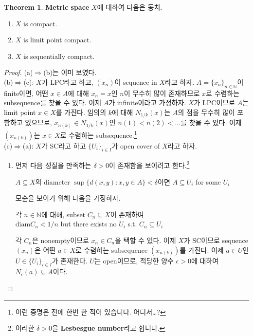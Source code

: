 \documentclass[12pt]{article}
\theoremstyle{definition}
\newtheorem{thm}{Theorem}[section]
\def\NN{\mathbb{N}}
\def\eps{\epsilon}
\begin{document}
	\begin{thm} \label{1.11}
		\textbf{Metric space} \(X\)에 대하여 다음은 동치.
		\begin{enumerate}[label=(\alph*), leftmargin=2\parindent]
			\item
			\(X\) is compact.
			\item
			\(X\) is limit point compact.
			\item
			\(X\) is sequentially compact.
		\end{enumerate}	
	\end{thm}
	\begin{proof}
		(a)$\Rightarrow$(b)는 이미 보였다.\\
		(b)$\Rightarrow$(c): \(X\)가 LPC라고 하고, \((x_n)\)이 sequence in \(X\)라고 하자. \(A = \{x_n\}_{n \in \NN}\)이 finite이면, 어떤 \(x \in A\)에 대해 \(x_n = x\)인 \(n\)이 무수히 많이 존재하므로 \(x\)로 수렴하는 subsequence를 찾을 수 있다. 이제 \(A\)가 infinite이라고 가정하자. \(X\)가 LPC이므로 \(A\)는 limit point \(x \in X\)를 가진다. 임의의 \(k\)에 대해 \(N_{1/k} (x)\)는 \(A\)의 점을 무수히 많이 포함하고 있으므로, \(x_{n(k)} \in N_{1/k} (x)\)인 \(n(1) < n(2) < \ldots\)를 찾을 수 있다. 이제 \((x_{n(k)})\)는 \(x \in X\)로 수렴하는 subsequence.\footnote{이런 증명은 전에 한번 한 적이 있습니다. 어디서\ldots?}\\
		(c)$\Rightarrow$(a): \(X\)가 SC라고 하고 \(\{U_i\}_{i \in I}\)가 open cover of \(X\)라고 하자.
		\begin{enumerate}[label={Step \arabic*}, leftmargin=3\parindent]
			\item
			먼저 다음 성질을 만족하는 \(\delta > 0\)이 존재함을 보이려고 한다.\footnote{이러한 \(\delta > 0\)을 \textbf{Lesbesgue number}라고 합니다.}
			\begin{center}
				\(A \subseteq X\)의 diameter \(\sup \{d(x, y) : x, y \in A\} < \delta\)이면 \(A \subseteq U_i\) for some \(U_i\)
			\end{center}
			모순을 보이기 위해 다음을 가정하자.
			\begin{center}
				각 \(n \in \NN\)에 대해, subset \(C_n \subseteq X\)이 존재하여\\
				\(\mathrm{diam} C_n < 1/n\) but there exists no \(U_i\) s.t. \(C_n \subseteq U_i\)
			\end{center}
			각 \(C_n\)은 nonempty이므로 \(x_n \in C_n\)을 택할 수 있다. 이제 \(X\)가 SC이므로 sequence \((x_n)\)은 어떤 \(a \in X\)로 수렴하는 subsequence \((x_{n(k)})\)를 가진다. 이제 \(a \in U\)인 \(U \in \{U_i\}_{i \in I}\)가 존재한다. \(U\)는 open이므로, 적당한 양수 \(\eps > 0\)에 대하여 \(N_\eps (a) \subseteq A\)이다.\\

\end{enumerate}
\end{proof}
\end{document}
